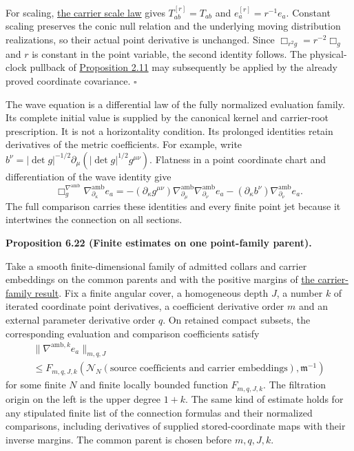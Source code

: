 \documentclass[
  english,
  11pt,
  reqno]{amsart}
\makeatletter
\newcommand{\pandocstatementheading}[1]{%
  \par\if@nobreak\else
    \addpenalty{\@beginparpenalty}%
    \addvspace{.5\baselineskip plus .2\baselineskip minus .2\baselineskip}%
  \fi
  {\normalfont\bfseries #1\par}%
  \nobreak\@afterindenttrue\@afterheading
}
\makeatother
\begin{document}
For scaling, \hyperref[prop:online-wave-carrier-families-scale]{the
carrier scale law} gives \(T_{ab}^{[r]}=T_{ab}\) and
\(e_a^{[r]}=r^{-1}e_a\). Constant scaling preserves the conic null
relation and the underlying moving distribution realizations, so their
actual point derivative is unchanged. Since \(\Box_{r^2g}=r^{-2}\Box_g\)
and \(r\) is constant in the point variable, the second identity
follows. The physical-clock pullback of
\hyperref[prop:online-cartan-physical-scale]{Proposition 2.11} may
subsequently be applied by the already proved coordinate covariance.
\hfill\(\square\)

The wave equation is a differential law of the fully normalized
evaluation family. Its complete initial value is supplied by the
canonical kernel and carrier-root prescription. It is not a
horizontality condition. Its prolonged identities retain derivatives of
the metric coefficients. For example, write
\(b^\nu=|\det g|^{-1/2}\partial_\mu(|\det g|^{1/2}g^{\mu\nu})\).
Flatness in a point coordinate chart and differentiation of the wave
identity give%
 \[
\Box_g^{\nabla^{\mathrm{amb}}}
   \nabla^{\mathrm{amb}}_{\partial_\kappa}e_a
=-(\partial_\kappa g^{\mu\nu})
    \nabla^{\mathrm{amb}}_{\partial_\mu}
    \nabla^{\mathrm{amb}}_{\partial_\nu}e_a
  -(\partial_\kappa b^\nu)
    \nabla^{\mathrm{amb}}_{\partial_\nu}e_a.
\] The full comparison carries these identities and every finite point
jet because it intertwines the connection on all sections.

\pandocstatementheading{\leavevmode{}\label{prop:online-point-connection-finite-families}Proposition 6.22 (Finite estimates on one point-family parent).}

Take a smooth finite-dimensional family of admitted collars and carrier
embeddings on the common parents and with the positive margins of
\hyperref[prop:online-wave-carrier-families-scale]{the carrier-family
result}. Fix a finite angular cover, a homogeneous depth \(J\), a number
\(k\) of iterated coordinate point derivatives, a coefficient derivative
order \(m\) and an external parameter derivative order \(q\). On
retained compact subsets, the corresponding evaluation and comparison
coefficients satisfy%
 \[
\begin{multlined}
\|\nabla^{\mathrm{amb},k}e_a\|_{m,q,J}
\\
\le F_{m,q,J,k}\left(
\mathcal N_N(\text{source coefficients and carrier embeddings}),
\mathfrak m^{-1}\right)
\end{multlined}
\] for some finite \(N\) and finite locally bounded function
\(F_{m,q,J,k}\). The filtration origin on the left is the upper degree
\(1+k\). The same kind of estimate holds for any stipulated finite list
of the connection formulas and their normalized comparisons, including
derivatives of supplied stored-coordinate maps with their inverse
margins. The common parent is chosen before \(m,q,J,k\).
\end{document}
